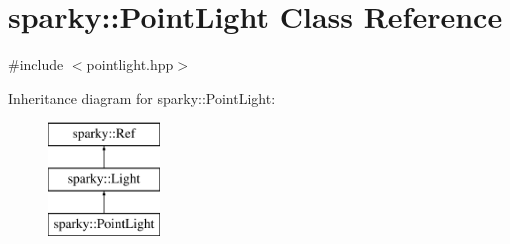 \hypertarget{classsparky_1_1_point_light}{}\section{sparky\+:\+:Point\+Light Class Reference}
\label{classsparky_1_1_point_light}


{\ttfamily \#include $<$pointlight.\+hpp$>$}

Inheritance diagram for sparky\+:\+:Point\+Light\+:\begin{figure}[H]
\begin{center}
\leavevmode
\includegraphics[height=3.000000cm]{classsparky_1_1_point_light}
\end{center}
\end{figure}
